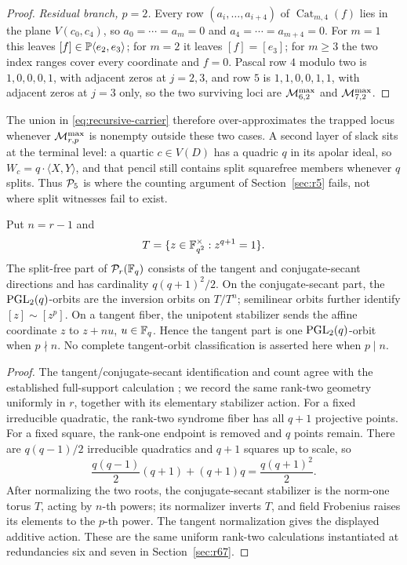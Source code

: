 \begin{proof}
\emph{Residual branch, \(p=2\).}  Every row \((a_i,\ldots,a_{i+4})\) of
\(\operatorname{Cat}_{m,4}(f)\) lies in the plane \(V(c_0,c_4)\), so
\(a_0=\cdots=a_m=0\) and \(a_4=\cdots=a_{m+4}=0\).  For \(m=1\) this leaves
\([f]\in\mathbb P\langle e_2,e_3\rangle\); for \(m=2\) it leaves \([f]=[e_3]\); for
\(m\geq3\) the two index ranges cover every coordinate and \(f=0\).  Pascal
row \(4\) modulo two is \(1,0,0,0,1\), with adjacent zeros at \(j=2,3\), and
row \(5\) is \(1,1,0,0,1,1\), with adjacent zeros at \(j=3\) only, so the two
surviving loci are \(\mathcal M^{\max}_{6,2}\) and \(\mathcal M^{\max}_{7,2}\).
\end{proof}

The union in \eqref{eq:recursive-carrier} therefore over-approximates the
trapped locus whenever \(\mathcal M^{\max}_{r,p}\) is nonempty outside these two
cases.  A second layer of slack sits at the terminal level: a quartic
\(c\in V(D)\) has a quadric \(q\) in its apolar ideal, so
\(W_c=q\cdot\langle X,Y\rangle\), and that pencil still contains split
squarefree members whenever \(q\) splits.  Thus \(\mathcal P_5\) is where the
counting argument of Section~\ref{sec:r5} fails, not where split witnesses
fail to exist.

\begin{proposition}
\label{prop:persistent-count-orbits}%
%
Put \(n=r-1\) and
\[
 T=\{z\in\mathbb F_{q^2}^{\times}:z^{q+1}=1\}.
\]
The split-free part of \(\mathcal P_r(\mathbb F_q)\) consists of the tangent and
conjugate-secant directions and has cardinality \(q(q+1)^2/2\).
On the conjugate-secant part, the \(\operatorname{PGL}_2(q)\)-orbits are the inversion
orbits on \(T/T^n\); semilinear orbits further identify
\([z]\sim[z^p]\).  On a tangent fiber, the unipotent stabilizer sends the
affine coordinate \(z\) to \(z+nu\), \(u\in\mathbb F_q\).  Hence the tangent part is
one \(\operatorname{PGL}_2(q)\)-orbit when \(p\nmid n\).  No complete tangent-orbit
classification is asserted here when \(p\mid n\).
\end{proposition}

\begin{proof}
The tangent/conjugate-secant identification and count agree with the
established full-support calculation
\cite[Thms.~I.4--I.6]{ZWK2020}; we record the
same rank-two geometry uniformly in \(r\), together with its elementary
stabilizer action.
For a fixed irreducible quadratic, the rank-two syndrome fiber has all
\(q+1\) projective points.  For a fixed square, the rank-one endpoint is
removed and \(q\) points remain.  There are \(q(q-1)/2\) irreducible
quadratics and \(q+1\) squares up to scale, so
\[
 \frac{q(q-1)}2(q+1)+(q+1)q=\frac{q(q+1)^2}{2}.
\]
After normalizing the two roots, the conjugate-secant stabilizer is the
norm-one torus \(T\), acting by \(n\)-th powers; its normalizer inverts \(T\),
and field Frobenius raises its elements to the \(p\)-th power.  The tangent
normalization gives the displayed additive action.  These are the same
uniform rank-two calculations instantiated at redundancies six and seven in
Section~\ref{sec:r67}.
\end{proof}

